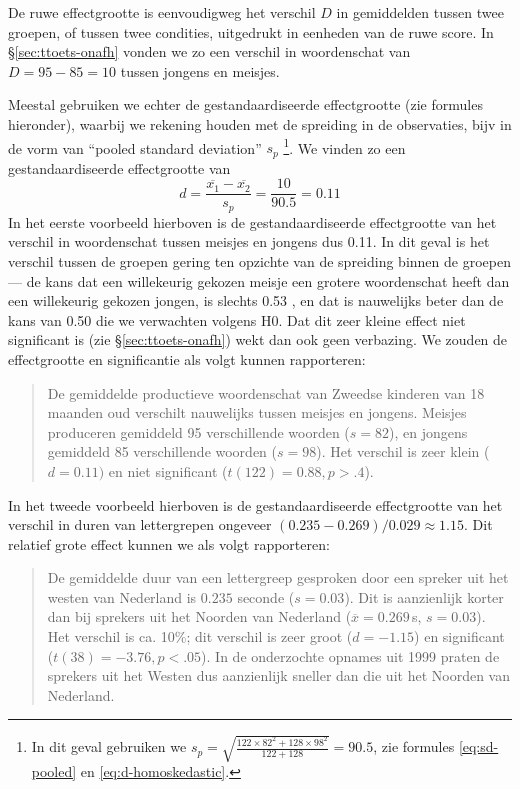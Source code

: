 \documentclass[
]{book}
\begin{document}
De ruwe effectgrootte is eenvoudigweg het verschil \(D\) in gemiddelden
tussen twee groepen, of tussen twee condities, uitgedrukt in eenheden
van de ruwe score. In §\ref{sec:ttoets-onafh} vonden we zo een verschil
in woordenschat van \(D=95-85=10\) tussen jongens en meisjes.

Meestal gebruiken we echter de gestandaardiseerde effectgrootte (zie
formules hieronder), waarbij we rekening houden met de spreiding in de
observaties, bijv in de vorm van ``pooled standard deviation'' \(s_p\)
\footnote{In dit geval gebruiken we
  \(s_p = \sqrt{ \frac{122\times82^2+128\times98^2} {122+128} } = 90.5\),
  zie formules \eqref{eq:sd-pooled} en \eqref{eq:d-homoskedastic}.}. We vinden zo een gestandaardiseerde effectgrootte van
\begin{equation}
  \label{eq:d-standardized}
    d = \frac{ \overline{x_1}-\overline{x_2} } {s_p} = \frac{10}{90.5} = 0.11
\end{equation}
In het eerste voorbeeld hierboven is de
gestandaardiseerde effectgrootte van het verschil in woordenschat tussen
meisjes en jongens dus 0.11. In dit geval is het verschil tussen de
groepen gering ten opzichte van de spreiding binnen de groepen --- de
kans dat een willekeurig gekozen meisje een grotere woordenschat heeft
dan een willekeurig gekozen jongen, is slechts 0.53 \citep{McGraw92}, en dat
is nauwelijks beter dan de kans van 0.50 die we verwachten volgens H0.
Dat dit zeer kleine effect niet significant is (zie
§\ref{sec:ttoets-onafh}) wekt dan ook geen verbazing. We zouden de
effectgrootte en significantie als volgt kunnen rapporteren:

\begin{quote}
De gemiddelde productieve woordenschat van Zweedse kinderen van 18
maanden oud verschilt nauwelijks tussen meisjes en jongens. Meisjes
produceren gemiddeld 95 verschillende woorden (\(s=82\)), en jongens
gemiddeld 85 verschillende woorden (\(s=98\)). Het verschil is zeer
klein (\(d=0.11)\) en niet significant (\(t(122)=0.88, p>.4\)).
\end{quote}

In het tweede voorbeeld hierboven is de gestandaardiseerde effectgrootte
van het verschil in duren van lettergrepen ongeveer
\((0.235-0.269)/0.029 \approx 1.15\). Dit relatief grote effect kunnen we
als volgt rapporteren:

\begin{quote}
De gemiddelde duur van een lettergreep gesproken door een spreker uit
het westen van Nederland is \(0.235\) seconde (\(s=0.03\)). Dit is
aanzienlijk korter dan bij sprekers uit het Noorden van Nederland
(\(\overline{x}=0.269\) s, \(s=0.03\)). Het verschil is ca. 10\%; dit
verschil is zeer groot (\(d=-1.15\)) en significant
(\(t(38)=-3.76, p<.05\)). In de onderzochte opnames uit 1999 praten de
sprekers uit het Westen dus aanzienlijk sneller dan die uit het
Noorden van Nederland.
\end{quote}
\end{document}
